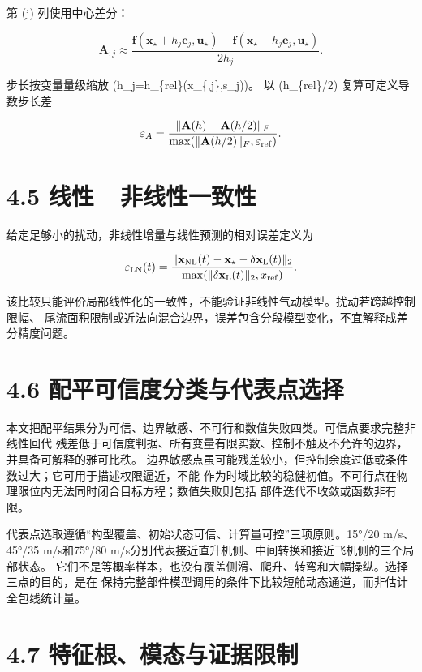 \documentclass[UTF8,11pt,oneside,openany,fontset=windows]{ctexbook}
\begin{document}
第 (j) 列使用中心差分：

\[
\mathbf A_{:j}\approx
\frac{\mathbf f(\mathbf x_\star+h_j\mathbf e_j,\mathbf u_\star)
-\mathbf f(\mathbf x_\star-h_j\mathbf e_j,\mathbf u_\star)}{2h_j}.
\]

步长按变量量级缩放
(h\_j=h\_\{\rm rel\}\max(\textbar x\_\{\star,j\}\textbar,s\_j))。 以
(h\_\{\rm rel\}/2) 复算可定义导数步长差

\[
\varepsilon_A=
\frac{\|\mathbf A(h)-\mathbf A(h/2)\|_F}
{\max(\|\mathbf A(h/2)\|_F,\varepsilon_{\rm ref})}.
\]

\section{4.5
线性---非线性一致性}\label{ux7ebfux6027ux975eux7ebfux6027ux4e00ux81f4ux6027}

给定足够小的扰动，非线性增量与线性预测的相对误差定义为

\[
\varepsilon_{\rm LN}(t)=
\frac{\|\mathbf x_{\rm NL}(t)-\mathbf x_\star-\delta\mathbf x_{\rm L}(t)\|_2}
{\max(\|\delta\mathbf x_{\rm L}(t)\|_2,x_{\rm ref})}.
\]

该比较只能评价局部线性化的一致性，不能验证非线性气动模型。扰动若跨越控制限幅、
尾流面积限制或近法向混合边界，误差包含分段模型变化，不宜解释成差分精度问题。

\section{4.6
配平可信度分类与代表点选择}\label{ux914dux5e73ux53efux4fe1ux5ea6ux5206ux7c7bux4e0eux4ee3ux8868ux70b9ux9009ux62e9}

本文把配平结果分为可信、边界敏感、不可行和数值失败四类。可信点要求完整非线性回代
残差低于可信度判据、所有变量有限实数、控制不触及不允许的边界，并具备可解释的雅可比秩。
边界敏感点虽可能残差较小，但控制余度过低或条件数过大；它可用于描述权限逼近，不能
作为时域比较的稳健初值。不可行点在物理限位内无法同时闭合目标方程；数值失败则包括
部件迭代不收敛或函数非有限。

代表点选取遵循``构型覆盖、初始状态可信、计算量可控''三项原则。15°/20
m/s、 45°/35 m/s和75°/80
m/s分别代表接近直升机侧、中间转换和接近飞机侧的三个局部状态。
它们不是等概率样本，也没有覆盖侧滑、爬升、转弯和大幅操纵。选择三点的目的，是在
保持完整部件模型调用的条件下比较短舱动态通道，而非估计全包线统计量。

\section{4.7
特征根、模态与证据限制}\label{ux7279ux5f81ux6839ux6a21ux6001ux4e0eux8bc1ux636eux9650ux5236}
\end{document}
